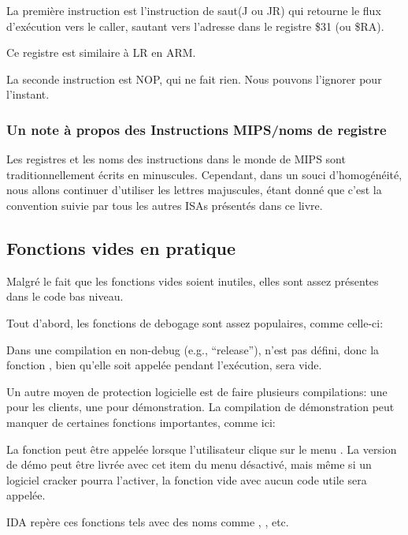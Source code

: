 

La première instruction est l'instruction de saut(J ou JR) qui retourne le flux d'exécution vers le \gls{caller},
sautant vers l'adresse dans le registre \$31 (ou \$RA).

Ce registre est similaire à \ac{LR} en ARM.

La seconde instruction est \ac{NOP}, qui ne fait rien.
Nous pouvons l'ignorer pour l'instant.

\subsubsection{Un note à propos des Instructions MIPS/noms de registre}

Les registres et les noms des instructions dans le monde de MIPS sont traditionnellement écrits en minuscules.
Cependant, dans un souci d'homogénéité, nous allons continuer d'utiliser les lettres majuscules,
étant donné que c'est la convention suivie par tous les autres \ac{ISA}s présentés dans ce livre.

\subsection{Fonctions vides en pratique}

Malgré le fait que les fonctions vides soient inutiles, elles sont assez présentes dans le code bas niveau.

Tout d'abord, les fonctions de debogage sont assez populaires, comme celle-ci:



Dans une compilation en non-debug (e.g., ``release''),  n'est pas défini,
donc la fonction , bien qu'elle soit appelée pendant l'exécution,
sera vide.

Un autre moyen de protection logicielle est de faire plusieurs compilations: une pour les clients, une pour démonstration.
La compilation de démonstration peut manquer de certaines fonctions importantes, comme ici:



La fonction  peut être appelée lorsque l'utilisateur clique sur le menu .
La version de démo peut être livrée avec cet item du menu désactivé, mais même si un logiciel cracker pourra l'activer,
la fonction vide avec aucun code utile sera appelée.

IDA repère ces fonctions tels avec des noms comme , , etc.


